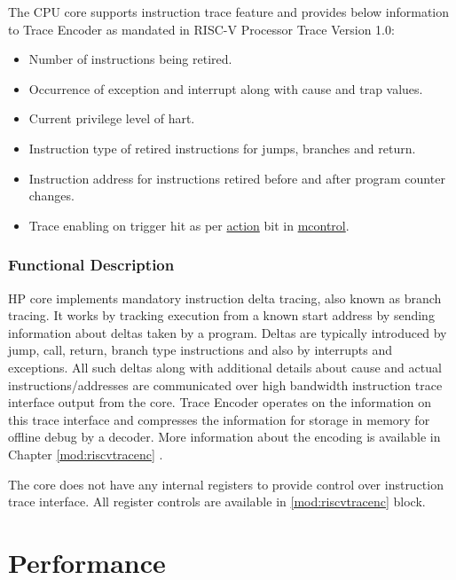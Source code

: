 \documentclass[main\_\_EN.tex]{subfiles}
\begin{document}
The CPU core supports instruction trace feature and provides below information to Trace Encoder as mandated in RISC-V Processor Trace Version 1.0:

\begin{itemize}
    \item Number of instructions being retired.
    \item Occurrence of exception and interrupt along with cause and trap values.
    \item Current privilege level of hart.
    \item Instruction type of retired instructions for jumps, branches and return.
    \item Instruction address for instructions retired before and after program counter changes.
    \item Trace enabling on trigger hit as per \hyperref[regdesc:MCONTROL]{action} bit in \hyperref[regdesc:MCONTROL]{mcontrol}.
\end{itemize}


\subsubsection{Functional Description}
\label{sec:riscvcpu-trace-func-descr}

HP core implements mandatory instruction delta tracing, also known as branch tracing. It works by tracking execution from a known start address by sending information about deltas taken by a program. Deltas are typically introduced by jump, call, return, branch type instructions and also by interrupts and exceptions. All such deltas along with additional details about cause and actual instructions/addresses are communicated over high bandwidth instruction trace interface output from the core. Trace Encoder operates on the information on this trace interface and compresses the information for storage in memory for offline debug by a decoder. More information about the encoding is available in Chapter \ref{mod:riscvtracenc} \textit{}.

The core does not have any internal registers to provide control over instruction trace interface. All register controls are available in \ref{mod:riscvtracenc} \textit{} block.

\newpage
\section{Performance}
\label{sec:riscvcpu-perf-enhancements}
\end{document}
